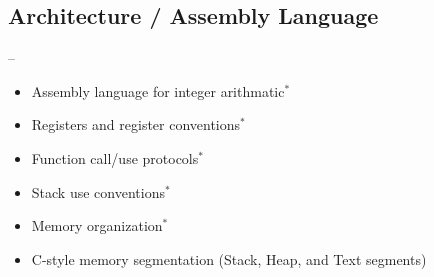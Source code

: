 \subsection{Architecture / Assembly Language} --
\label{sec:arch}
\begin{itemize}
  \item Assembly language for integer arithmatic$^*$
  \item Registers and register conventions$^*$
  \item Function call/use protocols$^*$
  \item Stack use conventions$^*$
  \item Memory organization$^*$
  \item C-style memory segmentation (Stack, Heap, and Text segments)
\end{itemize}
